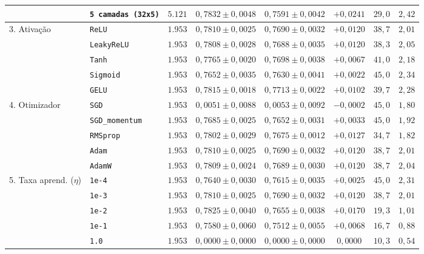 \documentclass[12pt,a4paper]{article}
\begin{document}
\begin{table}[H]
{\begin{tabular}{llcccccc}
 & \texttt{5 camadas (32x5)} & $5.121$ & $0{,}7832 \pm 0{,}0048$ & $0{,}7591 \pm 0{,}0042$ & $+0{,}0241$ & $29{,}0$ & $2{,}42$ \\
\midrule
\multirow{5}{*}{3. Ativação} 
 & \texttt{ReLU} & $1.953$ & $0{,}7810 \pm 0{,}0025$ & $0{,}7690 \pm 0{,}0032$ & $+0{,}0120$ & $38{,}7$ & $2{,}01$ \\
 & \texttt{LeakyReLU} & $1.953$ & $0{,}7808 \pm 0{,}0028$ & $0{,}7688 \pm 0{,}0035$ & $+0{,}0120$ & $38{,}3$ & $2{,}05$ \\
 & \texttt{Tanh} & $1.953$ & $0{,}7765 \pm 0{,}0020$ & $0{,}7698 \pm 0{,}0038$ & $+0{,}0067$ & $41{,}0$ & $2{,}18$ \\
 & \texttt{Sigmoid} & $1.953$ & $0{,}7652 \pm 0{,}0035$ & $0{,}7630 \pm 0{,}0041$ & $+0{,}0022$ & $45{,}0$ & $2{,}34$ \\
 & \texttt{GELU} & $1.953$ & $0{,}7815 \pm 0{,}0018$ & $0{,}7713 \pm 0{,}0022$ & $+0{,}0102$ & $39{,}7$ & $2{,}28$ \\
\midrule
\multirow{5}{*}{4. Otimizador} 
 & \texttt{SGD} & $1.953$ & $0{,}0051 \pm 0{,}0088$ & $0{,}0053 \pm 0{,}0092$ & $-0{,}0002$ & $45{,}0$ & $1{,}80$ \\
 & \texttt{SGD\_momentum} & $1.953$ & $0{,}7685 \pm 0{,}0025$ & $0{,}7652 \pm 0{,}0031$ & $+0{,}0033$ & $45{,}0$ & $1{,}92$ \\
 & \texttt{RMSprop} & $1.953$ & $0{,}7802 \pm 0{,}0029$ & $0{,}7675 \pm 0{,}0012$ & $+0{,}0127$ & $34{,}7$ & $1{,}82$ \\
 & \texttt{Adam} & $1.953$ & $0{,}7810 \pm 0{,}0025$ & $0{,}7690 \pm 0{,}0032$ & $+0{,}0120$ & $38{,}7$ & $2{,}01$ \\
 & \texttt{AdamW} & $1.953$ & $0{,}7809 \pm 0{,}0024$ & $0{,}7689 \pm 0{,}0030$ & $+0{,}0120$ & $38{,}7$ & $2{,}04$ \\
\midrule
\multirow{5}{*}{5. Taxa aprend. ($\eta$)} 
 & \texttt{1e-4} & $1.953$ & $0{,}7640 \pm 0{,}0030$ & $0{,}7615 \pm 0{,}0035$ & $+0{,}0025$ & $45{,}0$ & $2{,}31$ \\
 & \texttt{1e-3} & $1.953$ & $0{,}7810 \pm 0{,}0025$ & $0{,}7690 \pm 0{,}0032$ & $+0{,}0120$ & $38{,}7$ & $2{,}01$ \\
 & \texttt{1e-2} & $1.953$ & $0{,}7825 \pm 0{,}0040$ & $0{,}7655 \pm 0{,}0038$ & $+0{,}0170$ & $19{,}3$ & $1{,}01$ \\
 & \texttt{1e-1} & $1.953$ & $0{,}7580 \pm 0{,}0060$ & $0{,}7512 \pm 0{,}0055$ & $+0{,}0068$ & $16{,}7$ & $0{,}88$ \\
 & \texttt{1.0} & $1.953$ & $0{,}0000 \pm 0{,}0000$ & $0{,}0000 \pm 0{,}0000$ & $0{,}0000$ & $10{,}3$ & $0{,}54$ \\

\end{tabular}}
\end{table}
\end{document}
